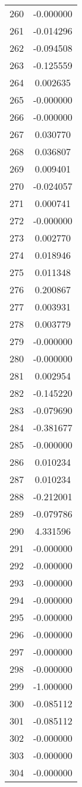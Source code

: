 \documentclass[12pt]{article}
\begin{document}
\begin{longtable}{@{}cc@{}}
260 & -0.000000 \\
261 & -0.014296 \\
262 & -0.094508 \\
263 & -0.125559 \\
264 & 0.002635 \\
265 & -0.000000 \\
266 & -0.000000 \\
267 & 0.030770 \\
268 & 0.036807 \\
269 & 0.009401 \\
270 & -0.024057 \\
271 & 0.000741 \\
272 & -0.000000 \\
273 & 0.002770 \\
274 & 0.018946 \\
275 & 0.011348 \\
276 & 0.200867 \\
277 & 0.003931 \\
278 & 0.003779 \\
279 & -0.000000 \\
280 & -0.000000 \\
281 & 0.002954 \\
282 & -0.145220 \\
283 & -0.079690 \\
284 & -0.381677 \\
285 & -0.000000 \\
286 & 0.010234 \\
287 & 0.010234 \\
288 & -0.212001 \\
289 & -0.079786 \\
290 & 4.331596 \\
291 & -0.000000 \\
292 & -0.000000 \\
293 & -0.000000 \\
294 & -0.000000 \\
295 & -0.000000 \\
296 & -0.000000 \\
297 & -0.000000 \\
298 & -0.000000 \\
299 & -1.000000 \\
300 & -0.085112 \\
301 & -0.085112 \\
302 & -0.000000 \\
303 & -0.000000 \\
304 & -0.000000 \\

\end{longtable}
\end{document}
